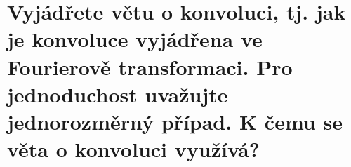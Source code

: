 \section{Vyjádřete větu o konvoluci, tj. jak je konvoluce vyjádřena ve Fourierově transformaci. Pro jednoduchost 
uvažujte jednorozměrný případ. K čemu se věta o konvoluci využívá?}